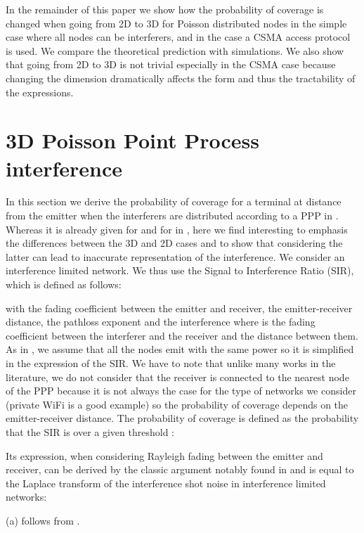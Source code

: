 \documentclass{sig-alternate-05-2015}
\begin{document}
In the remainder of this paper we show how the probability of coverage is changed when going from 2D to 3D for Poisson distributed nodes in the simple case where all nodes can be interferers, and in the case a CSMA access protocol is used. We compare the theoretical prediction with simulations. We also show that going from 2D to 3D is not trivial especially in the CSMA case because changing the dimension dramatically affects the form and thus the tractability of the expressions.

\section{3D Poisson Point Process interference}
\label{PPPsec}
In this section we derive the probability of coverage for a terminal at distance  from the emitter when the interferers are distributed according to a PPP  in . Whereas it is already given for  and for  in \cite{baccelli09}, here we find interesting to emphasis the differences between the 3D and 2D cases and to show that considering the latter can lead to inaccurate representation of the interference.
We consider an interference limited network. We thus use the Signal to Interference Ratio (SIR), which is defined as follows:




with  the fading coefficient between the emitter and receiver,  the emitter-receiver distance,  the pathloss exponent and  the interference where  is the fading coefficient between the interferer  and the receiver and  the distance between them. As in \cite{nguyen07,hasan07}, we assume that all the nodes emit with the same power so it is simplified in the expression of the SIR. We have to note that unlike many works in the literature, we do not consider that the receiver is connected to the nearest node of the PPP because it is not always the case for the type of networks we consider (private WiFi is a good example) so the probability of coverage depends on the emitter-receiver distance. The probability of coverage is defined as the probability that the SIR is over a given threshold :

Its expression, when considering Rayleigh fading between the emitter and receiver, can be derived by the classic argument notably found in \cite{baccelli09} and is equal to the Laplace transform of the interference shot noise in interference limited networks:




(a) follows from .
\end{document}
